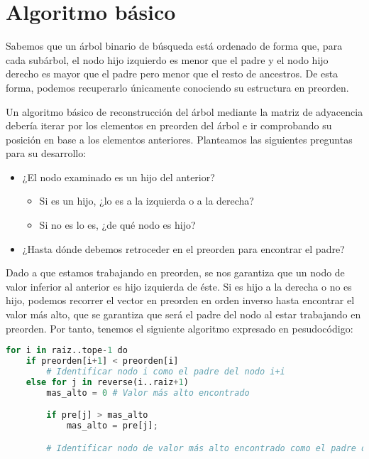 \section{Algoritmo básico}\label{dyv-basico}

Sabemos que un árbol binario de búsqueda está ordenado de forma que, para cada subárbol, el nodo hijo izquierdo es menor que el padre y el nodo hijo derecho es mayor que el padre pero menor que el resto de ancestros.
De esta forma, podemos recuperarlo únicamente conociendo su estructura en preorden.

Un algoritmo básico de reconstrucción del árbol mediante la matriz de adyacencia debería iterar por los elementos en preorden del árbol e ir comprobando su posición en base a los elementos anteriores.
Planteamos las siguientes preguntas para su desarrollo:

\pagebreak

\begin{itemize}
	\item ¿El nodo examinado es un hijo del anterior?
	\begin{itemize}
		\item Si es un hijo, ¿lo es a la izquierda o a la derecha?
		\item Si no es lo es, ¿de qué nodo es hijo?
	\end{itemize}
	\item ¿Hasta dónde debemos retroceder en el preorden para encontrar el padre?
\end{itemize}

Dado a que estamos trabajando en preorden, se nos garantiza que un nodo de valor inferior al anterior es hijo izquierda de éste.
Si es hijo a la derecha o no es hijo, podemos recorrer el vector en preorden en orden inverso hasta encontrar el valor más alto, que se garantiza que será el padre del nodo al estar trabajando en preorden.
Por tanto, tenemos el siguiente algoritmo expresado en pesudocódigo:

\begin{lstlisting}[language=Python]
for i in raiz..tope-1 do
	if preorden[i+1] < preorden[i]
		# Identificar nodo i como el padre del nodo i+i
	else for j in reverse(i..raiz+1)
		mas_alto = 0 # Valor más alto encontrado

		if pre[j] > mas_alto
			mas_alto = pre[j];

		# Identificar nodo de valor más alto encontrado como el padre del nodo i+i
\end{lstlisting}

